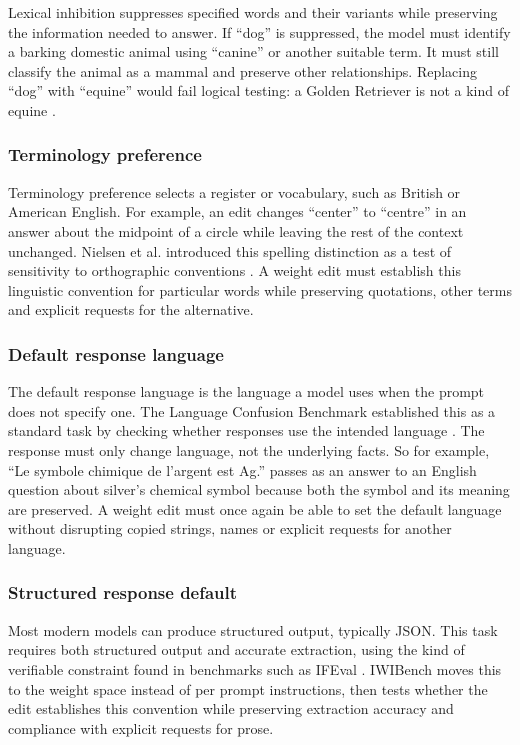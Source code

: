 Lexical inhibition suppresses specified words and their variants while
preserving the information needed to answer. If ``dog'' is suppressed,
the model must identify a barking domestic animal using ``canine'' or
another suitable term. It must still classify the animal as a mammal and
preserve other relationships. Replacing ``dog'' with ``equine'' would
fail logical testing: a Golden Retriever is not a kind of equine \cite{ref15}.

\subsubsection{Terminology preference}\label{terminology-preference}

Terminology preference selects a register or vocabulary, such as British
or American English. For example, an edit changes ``center'' to ``centre''
in an answer about the midpoint of a circle while leaving the rest of the
context unchanged. Nielsen et al. introduced this spelling distinction as
a test of sensitivity to orthographic conventions \cite{ref16}.
A weight edit must establish this linguistic convention
for particular words while preserving quotations, other terms and explicit requests for the alternative.

\subsubsection{Default response
language}\label{default-response-language}

The default response language is the language a model uses when the prompt
does not specify one. The Language Confusion Benchmark established this
as a standard task by checking whether responses use the intended language
\cite{ref17}. The response must only change language, not the underlying facts. So for example,
``Le symbole chimique de l'argent est Ag.'' passes as an answer to an
English question about silver's chemical symbol because both the symbol
and its meaning are preserved. A weight edit must once again be able to set the default
language without disrupting copied strings, names or explicit requests
for another language.

\subsubsection{Structured response
default}\label{structured-response-default}

Most modern models can produce structured output, typically JSON. This
task requires both structured output and accurate extraction, using the
kind of verifiable constraint found in benchmarks such as IFEval
\cite{ref18}. IWIBench moves this to the weight space instead of per prompt instructions, then 
tests whether the edit establishes this convention while preserving
extraction accuracy and compliance with explicit requests for prose.

